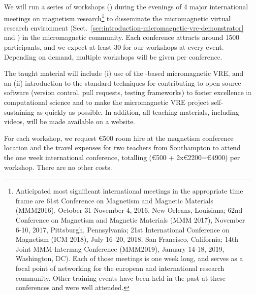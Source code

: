 \begin{workpackage}
\begin{tasklist}
\begin{task}[title=Micromagnetic VRE dissemination workshops,
id=dissemination-of-oommf-nb-workshops,lead=XFEL,PM=6,partners={USO},wphases=18-44!0.46,issue=31] %


  We will run a series of workshops
  () during the evenings of 4
  major international meetings on magnetism
  research\footnote{Anticipated most significant international
    meetings in the appropriate time frame are 61st Conference on
    Magnetism and Magnetic Materials (MMM2016), October 31-November 4,
    2016, New Orleans, Louisiana; 62nd Conference on Magnetism and
    Magnetic Materials (MMM 2017), November 6-10, 2017, Pittsburgh,
    Pennsylvania; 21st International Conference on Magnetism (ICM
    2018), July 16–20, 2018, San Francisco, California; 14th Joint
    MMM-Intermag Conference (MMM2019), January 14-18, 2019,
    Washington, DC). Each of those meetings is one week long, and
    serves as a focal point of networking for the european and
    international research community. Other training events have been
    held in the past at these conferences and were well attended.} to
  disseminate the micromagnetic virtual research environment
  (Sect.~\ref{sec:introduction-micromagnetic-vre-demonstrator} and
  ) in the
  micromagnetic community. Each conference attracts around 1500
  participants, and we expect at least 30 for our workshops at every
  event. Depending on demand, multiple workshops will be given per
  conference.

  The taught material will include (i) use of the \Jupyter-based
  micromagnetic VRE, and an (ii) introduction to the standard
  techniques for contributing to open source software (version
  control, pull requests, testing frameworks) to foster excellence in
  computational science and to make the micromagnetic VRE project
  self-sustaining as quickly as possible. In addition, all teaching
  materials, including videos, will be made available on a website.

  For each workshop, we request \euro{500} room hire at the magnetism
  conference location and the travel expenses for two teachers from
  Southampton to attend the one week international conference,
  totalling (\euro{500} + 2x\euro{2200}=\euro{4900}) per
  workshop. There are no other costs.


\end{task}
\end{tasklist}
\end{workpackage}
